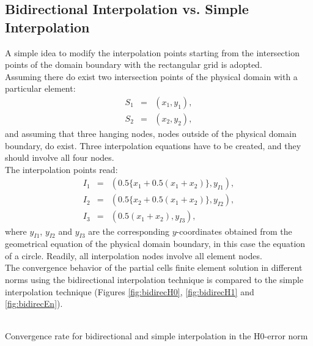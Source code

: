 \documentclass[a4paper,12pt]{article}
\makeatletter
\newenvironment{figurehere}
  {\def\@captype{figure}}
  {}
\makeatother
\begin{document}
\subsection{Bidirectional Interpolation vs. Simple Interpolation}\label{sec:bidir}
A simple idea to modify the interpolation points starting from the intersection points of the domain boundary with the rectangular grid is adopted.\\
Assuming there do exist two intersection points of the physical domain with a particular element:
\begin{eqnarray}
S_1 &=& (x_1,y_1),\\
S_2 &=& (x_2,y_2),
\end{eqnarray}
and assuming that three hanging nodes, nodes outside of the physical domain boundary, do exist. Three interpolation equations have to be created, and they should involve all four nodes.\\
The interpolation points read:
\begin{eqnarray}
I_1 &=& (0.5\{x_1+0.5(x_1 + x_2)\}, y_{I1}),\\
I_2 &=& (0.5\{x_2+0.5(x_1 + x_2)\},y_{I2}),\\
I_3 &=& (0.5(x_1 + x_2),y_{I3}),
\end{eqnarray}
where $y_{I1}$, $y_{I2}$ and $y_{I3}$ are the corresponding $y$-coordinates obtained from the geometrical equation of the physical domain boundary, in this case the equation of a circle. Readily, all interpolation nodes involve all element nodes.\\
The convergence behavior of the partial cells finite element solution in different norms using the bidirectional interpolation technique is compared to the simple interpolation technique (Figures \ref{fig:bidirecH0}, \ref{fig:bidirecH1} and \ref{fig:bidirecEn}).
\begin{center}
\begin{figurehere}
\\
\caption{Convergence rate for bidirectional and simple interpolation in the H0-error norm}\label{fig:bidirecH0}
\end{figurehere}
\end{center}
\end{document}
